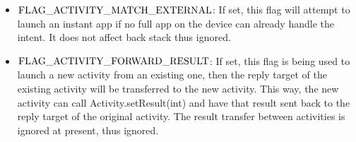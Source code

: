 {\begin{itemize}
%
    \item $\rm FLAG\_ACTIVITY\_MATCH\_EXTERNAL$: If set, this flag will attempt to launch an instant app if no full app on the device can already handle the intent. It does not affect back stack thus ignored.
%
    \item $\rm FLAG\_ACTIVITY\_FORWARD\_RESULT$: If set, this flag is being used to launch a new activity from an existing one, then the reply target of the existing activity will be transferred to the new activity. This way, the new activity can call Activity.setResult(int) and have that result sent back to the reply target of the original activity. The result transfer between activities is ignored at present, thus ignored.
\end{itemize}
}

%




